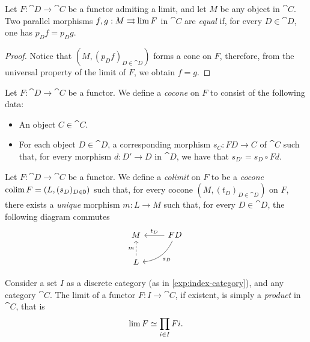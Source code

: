 \begin{proposition}
    \label{prop:equal-parallel-factorizations}
    Let \(F: \cat D \to \cat C\) be a functor admiting a limit, and let \(M\) be any
    object in \(\cat C\). Two parallel morphisms \(f, g: M \rightrightarrows \operatorname{lim} F\) in
    \(\cat C\) are \emph{equal} if, for every \(D \in \cat D\), one has
    \(p_D f = p_D g\).
\end{proposition}

\begin{proof}
    Notice that \((M, (p_D f)_{D \in \cat D})\) forms a cone on \(F\), therefore,
    from the universal property of the limit of \(F\), we obtain \(f = g\).
\end{proof}

\begin{definition}[Cocone]
    \label{def:cocone}
    Let \(F: \cat D \to \cat C\) be a functor. We define a \emph{cocone} on \(F\) to
    consist of the following data:
    \begin{itemize}\setlength\itemsep{0em}
        \item An object \(C \in \cat C\).

        \item For each object \(D \in \cat D\), a corresponding morphism \(s_C: F D \to
              C\) of \(\cat C\) such that, for every morphism \(d: D' \to D\) in \(\cat D\),
              we have that \(s_{D'} = s_D \circ F d\).
    \end{itemize}
\end{definition}

\begin{definition}[Colimit]
    \label{def:colimit}
    Let \(F: \cat D \to \cat C\) be a functor. We define a \emph{colimit} on \(F\)
    to be a \emph{cocone} \(\operatorname{colim} F = (L, (s_D)_{D \in \texttt D})\) such that, for
    every cocone \((M, (t_D)_{D \in \cat D})\) on \(F\), there exists a
    \emph{unique} morphism \(m: L \to M\) such that, for every \(D \in \cat D\), the
    following diagram commutes
    \[
        \begin{tikzcd}
            M &F D \ar[l, "t_D"'] \ar[dl, bend left, "s_D"] \\
            L \ar[u, dashed, "m"] &
        \end{tikzcd}
    \]
\end{definition}

\begin{example}[Products]
    \label{exp:product-is-limit-over-indexing-set-diagram}
    Consider a set \(I\) as a discrete category (as in \cref{exp:index-category}),
    and any category \(\cat C\). The limit of a functor \(F: I \to \cat C\), if
    existent, is simply a \emph{product} in \(\cat C\), that is
    \[
        \operatorname{lim} F \simeq \prod_{i \in I} F i.
    \]
\end{example}

